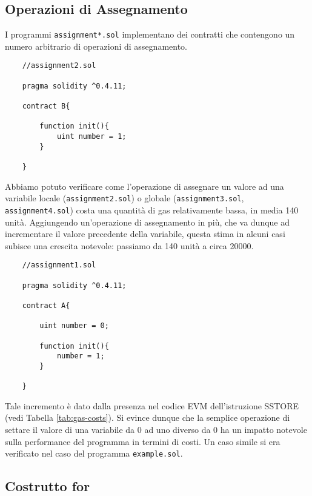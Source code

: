     \subsection{Operazioni di Assegnamento}
    
    I programmi \verb|assignment*.sol| implementano dei contratti che contengono un numero arbitrario di operazioni di assegnamento.
    
    \begin{lstlisting}
    //assignment2.sol
    
    pragma solidity ^0.4.11;

    contract B{

        function init(){
            uint number = 1;    
        }

    }

    \end{lstlisting}
    
    Abbiamo potuto verificare come l'operazione di assegnare un valore ad una variabile locale (\verb|assignment2.sol|) o globale (\verb|assignment3.sol|, \verb|assignment4.sol|) costa una quantità di gas relativamente bassa, in media 140 unità.
    Aggiungendo un'operazione di assegnamento in più, che va dunque ad incrementare il valore precedente della variabile, questa stima in alcuni casi subisce una crescita notevole: passiamo da 140 unità a circa 20000.
    
    \begin{lstlisting}
    //assignment1.sol
    
    pragma solidity ^0.4.11;

    contract A{

        uint number = 0;

        function init(){
            number = 1;    
        }

    }

    \end{lstlisting}
    
    Tale incremento è dato dalla presenza nel codice EVM dell'istruzione SSTORE (vedi Tabella \ref{tab:gas-costs}). Si evince dunque che la semplice operazione di settare il valore di una variabile da 0 ad uno diverso da 0 ha un impatto notevole sulla performance del programma in termini di costi. Un caso simile si era verificato nel caso del programma \verb|example.sol|.

    \subsection{Costrutto for}
    
